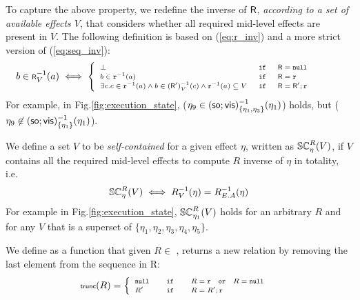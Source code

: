 To capture the above property, we redefine the 
inverse of ${\normalfont \textsf{R}}$, \emph{according to a set of available effects $V$}, 
that considers whether all required mid-level effects are present in $V$.
The following definition is based on (\ref{eq:r_inv}) and a more
strict version of (\ref{eq:seq_inv}):
\begin{equation}
\label{eq:R_inv}
\scriptsize
b \in {\normalfont \textsf{R}}^{-1}_V(a) \iff
\begin{cases}
\begin{array} {lllll} 
\bot & \;\mathtt {if}\; & {\normalfont \textsf{R}} = \mathtt{null}& & \\
b \in \mathtt{r}^{-1}(a) & \;\mathtt {if}\; & {\normalfont \textsf{R}}=\mathtt{r} & & \\
\exists c. c \in
\mathtt{r}^{-1}(a) \wedge b \in ({\normalfont \textsf{R}}')_V^{-1}(c) \wedge
\mathtt{r}^{-1}(a) \subseteq V   & \;\mathtt {if}\; & {\normalfont \textsf{R}}={\normalfont \textsf{R}}';\mathtt{r} & & \;
\end{array}
\end{cases}
\end{equation}
For example, in Fig.\ref{fig:execution_state}, 
{\footnotesize  ($\eta_9 \in
({\textsf{so}};{\normalfont \textsf{vis}})_{\{\eta_1,\eta_3\}}^{-1}(\eta_1)$)}
holds, but {\footnotesize($\eta_9 \not\in ({\textsf{so}};{\normalfont \textsf{vis}})_{\{\eta_1\}}^{-1}(\eta_1)$)}. 

We define a set $V$ to be \emph{self-contained} for
a given effect $\eta$,
written as {\footnotesize $\SC
R \eta V$}, if $V$ contains all the required mid-level effects to compute
$R$ inverse of $\eta$ in totality, i.e.
\begin{equation}
\scriptsize 
\SC R \eta {V} \iff R^{-1}_V(\eta) = R^{-1}_{E.A}(\eta)
\end{equation}
For example in Fig.\ref{fig:execution_state}, {\footnotesize $\SC R
{\eta_1} V$} holds for an arbitrary  $R$ and for any $V$ that is a superset of
{\footnotesize $\{\eta_1,\eta_2,\eta_3,\eta_4,\eta_5\}$}.

We define {\footnotesize \trunc{}} as a function that
given  $R \in$ \relationS{}, 
returns a new relation by removing the last element from the sequence
in R:
\begin{equation}
\scriptsize
\trunc{R} = 
\begin{cases}
\begin{array}{lcl}
\nullR & \quad \myif \quad & R = \rel \quad \mathtt{or} \quad R = \nullR \\
R' & \quad \myif \quad & R = R';\rel 
\end{array}
\end{cases}
\end{equation}

